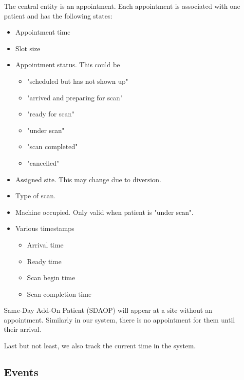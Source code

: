 The central entity is an appointment. Each appointment is associated
with one patient and has the following states:
\begin{itemize}
\item Appointment time
\item Slot size
\item Appointment status. This could be
  \begin{itemize}
  \item "scheduled but has not shown up"
  \item "arrived and preparing for scan"
  \item "ready for scan"
  \item "under scan"
  \item "scan completed"
  \item "cancelled"
  \end{itemize}
\item Assigned site. This may change due to diversion.
\item Type of scan.
\item Machine occupied. Only valid when patient is "under scan".
\item Various timestamps
  \begin{itemize}
  \item Arrival time
  \item Ready time
  \item Scan begin time
  \item Scan completion time
  \end{itemize}
\end{itemize}
Same-Day Add-On Patient (SDAOP) will appear at
a site without an appointment. Similarly in our system, there is no
appointment for them until their arrival.

Last but not least, we also track the current time in the system.


\subsection{Events}

